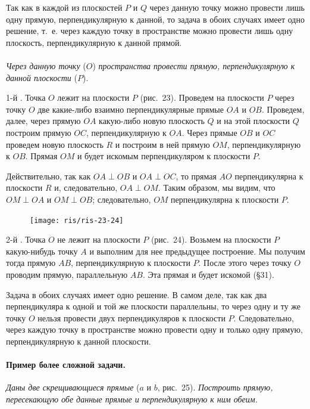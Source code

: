 \documentclass[twoside]{book}
\begin{document}
Так как в каждой из плоскостей $P$ и $Q$ через данную точку можно провести лишь одну прямую, перпендикулярную к данной, то задача в обоих случаях имеет одно решение, т.~е. через каждую точку в пространстве можно провести лишь одну плоскость, перпендикулярную к данной прямой.

\paragraph{}\label{1938/s36}
\emph{Через данную точку} ($O$) \emph{пространства провести прямую, перпендикулярную к данной плоскости} ($P$).

1-й .
Точка $O$ лежит на плоскости $P$ (рис.~23).
Проведем на плоскости $P$ через точку $O$ две какие-либо взаимно перпендикулярные прямые $OA$ и $OB$.
Проведем, далее, через прямую $OA$ какую-либо новую плоскость $Q$ и на этой плоскости $Q$ построим прямую $OC$, перпендикулярную к $OA$.
Через прямые $OB$ и $OC$ проведем новую плоскость $R$ и построим в ней прямую $OM$, перпендикулярную к $OB$.
Прямая $OM$ и будет искомым перпендикуляром к плоскости $P$.

Действительно, так как $OA \perp OB$ и $OA \perp OC$, то прямая $AO$ перпендикулярна к плоскости $R$ и, следовательно, $OA \perp OM$.
Таким образом, мы видим, что $OM\perp OA$ и $OM\perp OB$;
следовательно, $OM$ перпендикулярна к плоскости $P$.

\begin{figure}[h!]
\centering
\texttt{[image: ris/ris-23-24]}
\caption{}
\end{figure}

2-й .
Точка $O$ не лежит на плоскости $P$ (рис.~24).
Возьмем на плоскости $P$ какую-нибудь точку $A$ и выполним для нее предыдущее построение.
Мы получим тогда прямую $AB$, перпендикулярную к плоскости $P$.
После этого через точку $O$ проводим прямую, параллельную $AB$.
Эта прямая и будет искомой (§31).

Задача в обоих случаях имеет одно решение.
В самом деле, так как два перпендикуляра к одной и той же плоскости параллельны, то через одну и ту же точку $O$ нельзя провести двух перпендикуляров к плоскости $P$.
Следовательно, через каждую точку в пространстве можно провести одну и только одну прямую, перпендикулярную к данной плоскости.

\paragraph{Пример более сложной задачи.}\label{1938/s37}
\emph{Даны две скрещивающиеся прямые} ($a$ и $b$, рис.~25).
\emph{Построить прямую, пересекающую обе данные прямые и перпендикулярную к ним обеим.}
\end{document}
